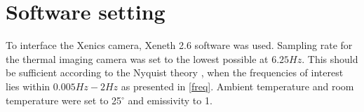 \section{Software setting}

To interface the Xenics camera, Xeneth 2.6 software was used.   
Sampling rate for the thermal imaging camera was set to the lowest possible at $6.25 Hz$. This should be sufficient according to the Nyquist theory \cite{weik2001}, when the frequencies of interest lies within $0.005 Hz-2 Hz$ as presented in \cref{freq}. Ambient temperature and room temperature were set to 25$^{\circ}$ and emissivity to 1.



